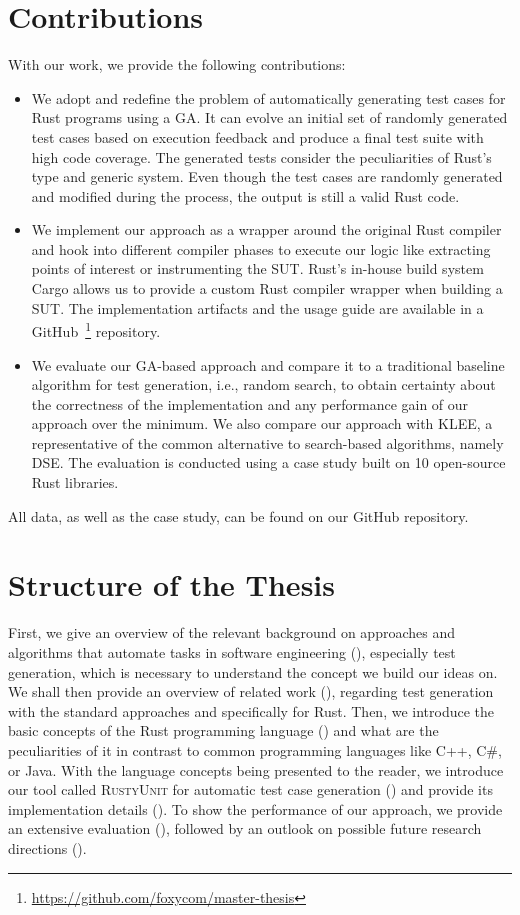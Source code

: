 \documentclass[paper=a4,%
  twoside,%
  BCOR4mm,%
  abstract=true,%
  toc=bibliography,%
  chapterprefix=true,%
  toc=bibliographynumbered,%
  open=right,%
  english,%
  pagesize=pdftex]{scrreprt}
\newcommand{\benchnum}{10\xspace}
\newcommand{\tech}{\textsc{RustyUnit}\xspace}
\begin{document}
\section{Contributions}
With our work, we provide the following contributions:
\begin{itemize}
  \item We adopt and redefine the problem of automatically generating test cases for Rust programs using a \ac{GA}. It can evolve an initial set of randomly generated test cases based on execution feedback and produce a final test suite with high code coverage. The generated tests consider the peculiarities of Rust's type and generic system. Even though the test cases are randomly generated and modified during the process, the output is still a valid Rust code.
  \item We implement our approach as a wrapper around the original Rust compiler and hook into different compiler phases to execute our logic like extracting points of interest or instrumenting the \ac{SUT}. Rust's in-house build system Cargo allows us to provide a custom Rust compiler wrapper when building a \ac{SUT}. The implementation artifacts and the usage guide are available in a GitHub~\footnote{\url{https://github.com/foxycom/master-thesis}} repository.
  \item We evaluate our \ac{GA}-based approach and compare it to a traditional baseline algorithm for test generation, i.e., random search, to obtain certainty about the correctness of the implementation and any performance gain of our approach over the minimum. We also compare our approach with KLEE, a representative of the common alternative to search-based algorithms, namely \ac{DSE}. The evaluation is conducted using a case study built on \benchnum open-source Rust libraries.
\end{itemize}
All data, as well as the case study, can be found on our GitHub repository.

\section{Structure of the Thesis}
First, we give an overview of the relevant background on approaches and algorithms that automate tasks in software engineering (), especially test generation, which is necessary to understand the concept we build our ideas on. We shall then provide an overview of related work (), regarding test generation with the standard approaches and specifically for Rust. Then, we introduce the basic concepts of the Rust programming language () and what are the peculiarities of it in contrast to common programming languages like C++, C\#, or Java. With the language concepts being presented to the reader, we introduce our tool called \tech for automatic test case generation () and provide its implementation details (). To show the performance of our approach, we provide an extensive evaluation (), followed by an outlook on possible future research directions ().
\end{document}
